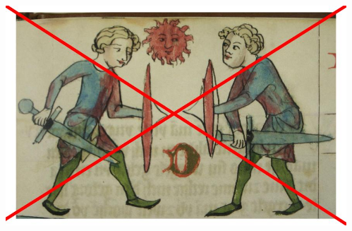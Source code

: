 \documentclass[xcolor=dvipsnames]{beamer}%
\begin{document}
\begin{frame}
\begin{columns}
\begin{column}{0.5\textwidth}
\begin{center}
			\end{center}
		\end{column}
		\begin{column}{0.5\textwidth}
			\begin{center}
				\includegraphics[width=\textwidth,height=0.8\textheight,keepaspectratio]{figure/sad_bozy.jpg}
			\end{center}
		\end{column}
	\end{columns}
\end{frame}
\end{document}
